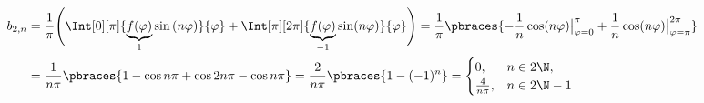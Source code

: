 \begin{solution}
\begin{enumerate}[label = (\roman*)]
    \begin{align*}
        b_{2, n}
        & =
        \frac{1}{\pi}
        \Bigg (
            \Int[0][\pi]
            {
                \underbrace{f(\varphi)}_1
                \sin{(n \varphi)}
            }{\varphi}
            +
            \Int[\pi][2 \pi]
            {
                \underbrace{f(\varphi)}_{-1}
                \sin(n \varphi)
            }{\varphi}
        \Bigg )
        =
        \frac{1}{\pi}
        \pbraces
        {
            -\frac{1}{n}
            \cos(n \varphi)
            \big |_{\varphi = 0}^\pi
            +
            \frac{1}{n}
            \cos(n \varphi)
            \big |_{\varphi = \pi}^{2 \pi}
        } \\
        & =
        \frac{1}{n \pi}
        \pbraces
        {
            1 - \cos{n \pi}
            +
            \cos{2n \pi} - \cos{n \pi}
        }
        =
        \frac{2}{n \pi}
        \pbraces
        {
            1 - (-1)^n
        }
        =
        \begin{cases}
            0,               & n \in 2 \N, \\
            \frac{4}{n \pi}, & n \in 2 \N - 1
        \end{cases}
    \end{align*}

\end{enumerate}



\end{solution}

